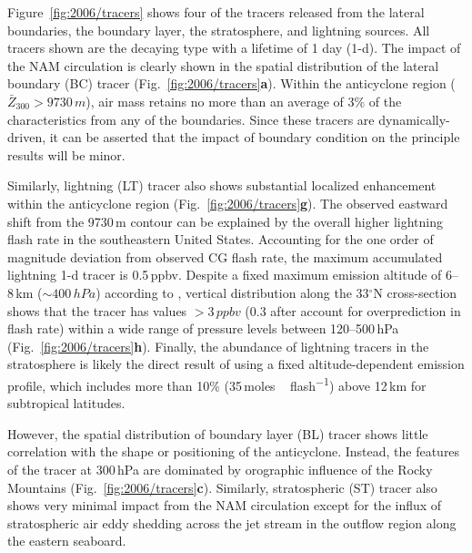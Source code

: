 Figure~\ref{fig:2006/tracers} shows four of the tracers released from the lateral boundaries, the boundary layer, the stratosphere, and
lightning sources. All tracers shown are the decaying type with a lifetime of 1 day (1-d). The impact of the NAM circulation is clearly shown
in the spatial distribution of the lateral boundary (BC) tracer (Fig.~\ref{fig:2006/tracers}{\bf a}). Within the anticyclone region ($\bar{Z}_{300}
>9730\,\unit{m}$), air mass retains no more than an average of 3\% of the characteristics from any of the boundaries. Since these
tracers are dynamically-driven, it can be asserted that the impact of boundary condition on the principle results will be minor.

Similarly, lightning (LT) tracer also shows substantial localized enhancement within the anticyclone region (Fig.~\ref{fig:2006/tracers}{\bf g}).
The observed eastward shift from the 9730\,\unit{m} contour can be explained by the overall higher lightning flash rate in the southeastern 
United States. Accounting for the one order of magnitude deviation from observed CG flash rate, the maximum accumulated lightning
1-d tracer is 0.5\,\unit{ppbv}. Despite a fixed maximum emission altitude of 6--8\,\unit{km} ($\sim400\,\unit{hPa}$) according to
\citet{Ott:2010lo}, vertical distribution along the 33$^\circ$N cross-section shows that the tracer has values $>3\,\unit{ppbv}$ (0.3
after account for overprediction in flash rate) within a wide range of pressure levels between 120--500\,\unit{hPa}
(Fig.~\ref{fig:2006/tracers}{\bf h}). Finally, the abundance of lightning tracers in the stratosphere is likely the direct result of using a
fixed altitude-dependent emission profile, which includes more than 10\% (35\,\unit{moles\,flash^{-1}}) above 12\,\unit{km} for
subtropical latitudes.

However, the spatial distribution of boundary layer (BL) tracer shows little correlation with the shape or positioning of the anticyclone. Instead,
the features of the tracer at 300\,\unit{hPa} are dominated by orographic influence of the Rocky Mountains (Fig.~\ref{fig:2006/tracers}{\bf c}).
Similarly, stratospheric (ST) tracer also shows very minimal impact from the NAM circulation except for the influx of stratospheric air eddy
shedding across the jet stream in the outflow region along the eastern seaboard.


